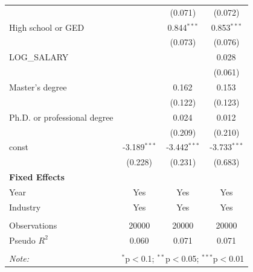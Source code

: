 \begin{table}[!htbp]
\begin{tabular}{@{\extracolsep{5pt}}lccc}
& & (0.071) & (0.072) \\
 High school or GED & & 0.844$^{***}$ & 0.853$^{***}$ \\
& & (0.073) & (0.076) \\
 LOG_SALARY & & & 0.028$^{}$ \\
& & & (0.061) \\
 Master's degree & & 0.162$^{}$ & 0.153$^{}$ \\
& & (0.122) & (0.123) \\
 Ph.D. or professional degree & & 0.024$^{}$ & 0.012$^{}$ \\
& & (0.209) & (0.210) \\
 const & -3.189$^{***}$ & -3.442$^{***}$ & -3.733$^{***}$ \\
& (0.228) & (0.231) & (0.683) \\
 \textbf{Fixed Effects} &  &  &  \\
 Year & Yes & Yes & Yes \\
 Industry & Yes & Yes & Yes \\
\hline \\[-1.8ex]
 Observations & 20000 & 20000 & 20000 \\
 Pseudo $R^2$ & 0.060 & 0.071 & 0.071 \\
\hline
\hline \\[-1.8ex]
\textit{Note:} & \multicolumn{3}{r}{$^{*}$p$<$0.1; $^{**}$p$<$0.05; $^{***}$p$<$0.01} \\
\end{tabular}
\end{table}